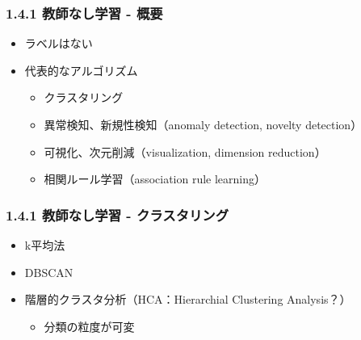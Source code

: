 \documentclass[aspectratio=169, dvipdfmx, 14pt, xcolor={svgnames,dvipsnames}]{beamer}
\def\tightlist{\itemsep1pt\parskip0pt\parsep0pt}
\begin{document}

\begin{frame}
  \frametitle{1.4.1 教師なし学習 - 概要}
  \begin{itemize}
    \tightlist
    \item
          ラベルはない
    \item
          代表的なアルゴリズム
          \begin{itemize}
            \item クラスタリング
            \item 異常検知、新規性検知（anomaly detection, novelty detection）
            \item 可視化、次元削減（visualization, dimension reduction）
            \item 相関ルール学習（association rule learning）
          \end{itemize}
  \end{itemize}
\end{frame}


\begin{frame}
  \frametitle{1.4.1 教師なし学習 - クラスタリング}
  \begin{itemize}
    \tightlist
    \item
          k平均法
    \item
          DBSCAN
    \item
          階層的クラスタ分析（HCA：Hierarchial Clustering Analysis？）

          \begin{itemize}
            \tightlist
            \item
                  分類の粒度が可変
          \end{itemize}
  \end{itemize}
\end{frame}

\end{document}
